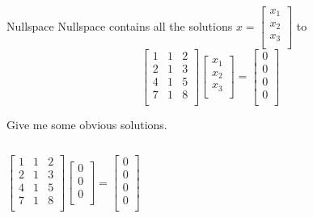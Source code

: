 \documentclass{beamer}
\begin{document}
\begin{frame}{Nullspace}
Nullspace contains all the solutions $x=\left[ \begin{array}{c}
        x_1\\
        x_2\\
        x_3\\
    \end{array} \right]$
to
\begin{equation*}
    \left[ \begin{matrix}
        1&		1&		2\\
        2&		1&		3\\
        4&		1&		5\\
        7&		1&		8\\
    \end{matrix} \right] \left[ \begin{array}{c}
        x_1\\
        x_2\\
        x_3\\
    \end{array} \right] =\left[ \begin{array}{c}
        0\\
        0\\
        0\\
        0\\
    \end{array} \right]
\end{equation*}

Give me some obvious solutions.

\vspace{-3pt}
\begin{columns}
    \begin{equation*}
        \left[ \begin{matrix}
            1&		1&		2\\
            2&		1&		3\\
            4&		1&		5\\
            7&		1&		8\\
        \end{matrix} \right] \left[ \begin{array}{c}
            0\\
            0\\
            0\\
        \end{array} \right] =\left[ \begin{array}{c}
            0\\
            0\\
            0\\
            0\\
        \end{array} \right]
    \end{equation*}


\end{columns}
\end{frame}
\end{document}
